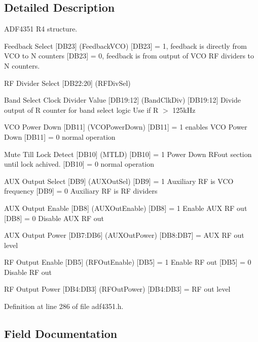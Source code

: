 \subsection{Detailed Description}
A\+D\+F4351 R4 structure. 

Feedback Select \mbox{[}D\+B23\mbox{]} (Feedback\+V\+CO) \mbox{[}D\+B23\mbox{]} = 1, feedback is directly from V\+CO to N counters \mbox{[}D\+B23\mbox{]} = 0, feedback is from output of V\+CO RF dividers to N counters.

RF Divider Select \mbox{[}D\+B22\+:20\mbox{]} (R\+F\+Div\+Sel)

Band Select Clock Divider Value \mbox{[}D\+B19\+:12\mbox{]} (Band\+Clk\+Div) \mbox{[}D\+B19\+:12\mbox{]} Divide output of R counter for band select logic Use if R $>$ 125k\+Hz

V\+CO Power Down \mbox{[}D\+B11\mbox{]} (V\+C\+O\+Power\+Down) \mbox{[}D\+B11\mbox{]} = 1 enables V\+CO Power Down \mbox{[}D\+B11\mbox{]} = 0 normal operation

Mute Till Lock Detect \mbox{[}D\+B10\mbox{]} (M\+T\+LD) \mbox{[}D\+B10\mbox{]} = 1 Power Down R\+Fout section until lock achived. \mbox{[}D\+B10\mbox{]} = 0 normal operation

A\+UX Output Select \mbox{[}D\+B9\mbox{]} (A\+U\+X\+Out\+Sel) \mbox{[}D\+B9\mbox{]} = 1 Auxiliary RF is V\+CO frequency \mbox{[}D\+B9\mbox{]} = 0 Auxiliary RF is RF dividers

A\+UX Output Enable \mbox{[}D\+B8\mbox{]} (A\+U\+X\+Out\+Enable) \mbox{[}D\+B8\mbox{]} = 1 Enable A\+UX RF out \mbox{[}D\+B8\mbox{]} = 0 Disable A\+UX RF out

A\+UX Output Power \mbox{[}D\+B7\+:D\+B6\mbox{]} (A\+U\+X\+Out\+Power) \mbox{[}D\+B8\+:D\+B7\mbox{]} = A\+UX RF out level

RF Output Enable \mbox{[}D\+B5\mbox{]} (R\+F\+Out\+Enable) \mbox{[}D\+B5\mbox{]} = 1 Enable RF out \mbox{[}D\+B5\mbox{]} = 0 Disable RF out

RF Output Power \mbox{[}D\+B4\+:D\+B3\mbox{]} (R\+F\+Out\+Power) \mbox{[}D\+B4\+:D\+B3\mbox{]} = RF out level 

Definition at line 286 of file adf4351.\+h.



\subsection{Field Documentation}
